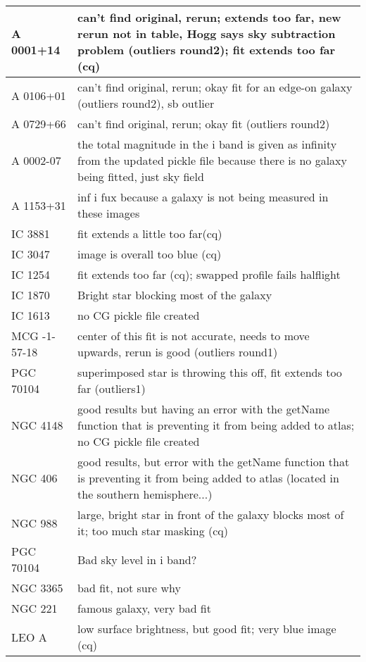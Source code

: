 \documentclass[10pt]{article}
\begin{document}
\begin{landscape}
\begin{longtable}{|l|l|}\hline
A 0001+14 & can't find original, rerun; extends too far, new rerun not in table, Hogg says sky subtraction problem (outliers round2); fit extends too far (cq) \\ \hline
A 0106+01 & can't find original, rerun; okay fit for an edge-on galaxy (outliers round2), sb outlier \\ \hline
A 0729+66 & can't find original, rerun; okay fit (outliers round2)\\ \hline
A 0002-07 & the total magnitude in the i band is given as infinity from the updated pickle file because there is no galaxy being fitted, just sky field \\ \hline
A 1153+31 & inf i fux because a galaxy is not being measured in these images \\ \hline
IC 3881 & fit extends a little too far(cq) \\ \hline
IC 3047 & image is overall too blue (cq) \\ \hline
IC 1254 & fit extends too far (cq); swapped profile fails halflight \\ \hline
IC 1870 & Bright star blocking most of the galaxy \\ \hline
IC 1613 & no CG pickle file created \\ \hline
MCG -1-57-18 & center of this fit is not accurate, needs to move upwards, rerun is good (outliers round1)\\ \hline
PGC 70104 & superimposed star is throwing this off, fit extends too far (outliers1)  \\ \hline
NGC 4148 & good results but having an error with the getName function that is preventing it from being added to atlas; no CG pickle file created\\ \hline
NGC 406 & good results, but error with the getName function that is preventing it from being added to atlas (located in the southern hemisphere...)\\ \hline
NGC 988 & large, bright star in front of the galaxy blocks most of it; too much star masking (cq)\\ \hline
PGC 70104 & Bad sky level in i band?\\ \hline
NGC 3365 & bad fit, not sure why\\ \hline
NGC 221 & famous galaxy, very bad fit\\ \hline 
LEO A & low surface brightness, but good fit; very blue image (cq)\\ \hline

\end{longtable}
\end{landscape}
\end{document}
